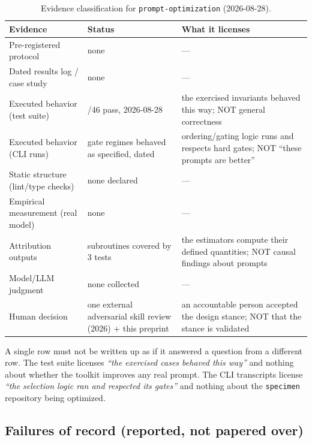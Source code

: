 \begin{table}[ht]
\centering
\small
\begin{tabular}{@{}p{4.0cm}>{\raggedright\arraybackslash}p{3.2cm}>{\raggedright\arraybackslash}p{5.4cm}@{}}
\toprule
\textbf{Evidence} & \textbf{Status} & \textbf{What it licenses} \\
\midrule
Pre-registered protocol & none & --- \\
Dated results log / case study & none & --- \\
Executed behavior (test suite) & 46/46 pass, 2026-08-28 & the exercised invariants behaved this way; NOT general correctness \\
Executed behavior (CLI runs) & gate regimes behaved as specified, dated & ordering/gating logic runs and respects hard gates; NOT ``these prompts are better'' \\
Static structure (lint/type checks) & none declared & --- \\
Empirical measurement (real model) & none & --- \\
Attribution outputs & subroutines covered by 3 tests & the estimators compute their defined quantities; NOT causal findings about prompts \\
Model/LLM judgment & none collected & --- \\
Human decision & one external adversarial skill review (2026) + this preprint & an accountable person accepted the design stance; NOT that the stance is validated \\
\bottomrule
\end{tabular}
\caption{Evidence classification for \texttt{prompt-optimization} (2026-08-28).}
\label{tab:evidence}
\end{table}

A single row must not be written up as if it answered a question from a
different row. The test suite licenses \emph{``the exercised cases behaved this
way''} and nothing about whether the toolkit improves any real prompt. The CLI
transcripts license \emph{``the selection logic ran and respected its gates''}
and nothing about the \texttt{specimen} repository being optimized.

\subsection{Failures of record (reported, not papered over)}

